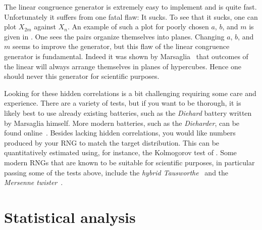 The linear congruence generator is extremely easy to implement and is quite
fast. Unfortunately it suffers from one fatal flaw: It sucks. To see that it
sucks, one can plot $X_{2m}$ against $X_n$. An example of such a plot for
poorly chosen $a$, $b$, and $m$ is given in . One sees the
pairs organize themselves into planes. Changing $a$, $b$, and $m$ seems
to improve the generator, but this flaw of the linear congruence generator
is fundamental. Indeed it was shown by Marsaglia~\cite{marsaglia_random_1968} that
outcomes of the linear will always arrange themselves in planes of hypercubes.
Hence one should never this generator for scientific purposes.

Looking for these hidden correlations is a bit challenging requiring some care
and experience. There are a variety of tests, but if you want to be thorough,
it is likely best to use already existing batteries, such as the {\it Diehard}
battery written by Marsaglia himself. More modern batteries, 
such as the {\it Dieharder}, can be found online~\cite{dieharder}.
Besides lacking hidden correlations, you would like numbers produced by your
RNG to match the target distribution. This can be quantitatively estimated
using, for instance, the Kolmogorov test of .
Some modern RNGs that are known to be suitable for scientific purposes,
in particular passing some of the tests above, include
the 
{\it hybrid Tausworthe}~\cite{tausworthe_random_1965,lecuyer_maximally_1996}
and 
the {\it Mersenne twister}~\cite{matsumoto_mersenne_1998}.

\section{Statistical analysis}\label{sec:statana}

